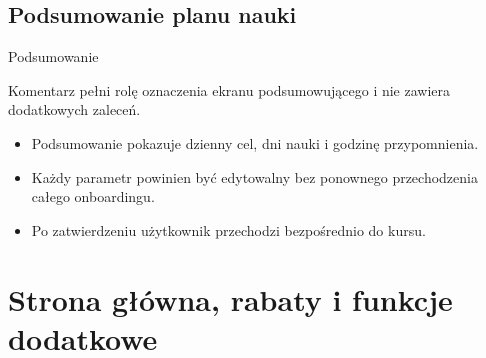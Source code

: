 \documentclass[12pt,a4paper]{report}
\begin{document}
\section{Podsumowanie planu nauki}
\begin{ElearnReviewComment}[title={Komentarz nr 2 -- Anna Kogut, 2026-07-22}]
Podsumowanie

Komentarz pełni rolę oznaczenia ekranu podsumowującego i nie zawiera dodatkowych zaleceń.
\end{ElearnReviewComment}
\begin{ElearnRequirement}[title={Wymagania wynikające z komentarza}]
\begin{itemize}
  \item Podsumowanie pokazuje dzienny cel, dni nauki i godzinę przypomnienia.
  \item Każdy parametr powinien być edytowalny bez ponownego przechodzenia całego onboardingu.
  \item Po zatwierdzeniu użytkownik przechodzi bezpośrednio do kursu.
\end{itemize}
\end{ElearnRequirement}
\clearpage
\chapter{Strona główna, rabaty i funkcje dodatkowe}
\end{document}

